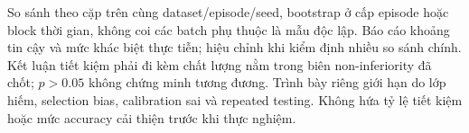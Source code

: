 So sánh theo cặp trên cùng dataset/episode/seed, bootstrap ở cấp episode hoặc block thời gian, không coi các batch phụ thuộc là mẫu độc lập. Báo cáo khoảng tin cậy và mức khác biệt thực tiễn; hiệu chỉnh khi kiểm định nhiều so sánh chính. Kết luận tiết kiệm phải đi kèm chất lượng nằm trong biên non-inferiority đã chốt; $p>0.05$ không chứng minh tương đương. Trình bày riêng giới hạn do lớp hiếm, selection bias, calibration sai và repeated testing. Không hứa tỷ lệ tiết kiệm hoặc mức accuracy cải thiện trước khi thực nghiệm.
